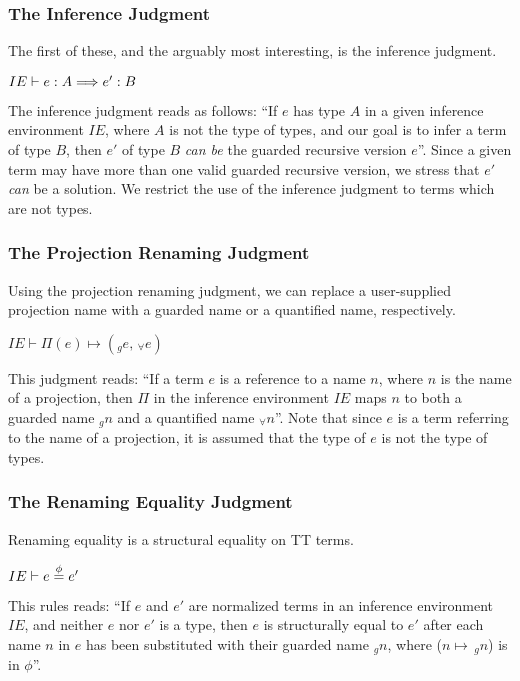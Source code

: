 \subsubsection{The Inference Judgment}
The first of these, and the arguably most interesting, is the inference judgment.

\begin{center}
  ${IE\vdash e : A \Longrightarrow e' : B}$
\end{center}

The inference judgment reads as follows: ``If $e$ has type $A$ in a given
inference environment $IE$, where $A$ is not
the type of types, and our goal is to infer a term of type $B$, then
$e'$ of type $B$ \emph{can be} the guarded recursive version $e$''. Since a
given term may have more than one valid guarded recursive version, we stress
that $e'$ \emph{can} be a solution. We restrict the use of the inference
judgment to terms which are not types.

\subsubsection{The Projection Renaming Judgment}
Using the projection renaming judgment, we can replace a user-supplied
projection name with a guarded name or a quantified name, respectively.
\begin{center}
  ${IE\vdash \Pi(e) \mapsto (_ge,\,_{\forall}e)}$
\end{center}
This judgment reads: ``If a term $e$ is a
reference to a name $n$, where $n$ is the name of a projection, then $\Pi$ in the inference environment $IE$ maps $n$
to both a guarded name $_gn$ and a quantified name $_{\forall}n$''. Note that since $e$ is a term referring
to the name of a projection, it is assumed that the type of $e$ is not the
type of types.

\subsubsection{The Renaming Equality Judgment}
Renaming equality is a structural equality on TT terms.
\begin{center}
  ${IE\vdash e \overset{\phi}{=} e'}$
\end{center}
This rules reads: ``If $e$ and $e'$ are normalized terms in an inference
environment $IE$, and neither $e$ nor $e'$ is a type,
then $e$ is structurally equal to $e'$ after each name $n$ in
$e$ has been substituted with their guarded name $_gn$, where ($n\mapsto\,_gn$) is in $\phi$''.

